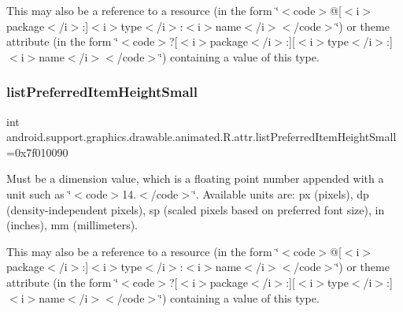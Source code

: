 This may also be a reference to a resource (in the form \char`\"{}$<$code$>$@\mbox{[}$<$i$>$package$<$/i$>$\+:\mbox{]}$<$i$>$type$<$/i$>$\+:$<$i$>$name$<$/i$>$$<$/code$>$\char`\"{}) or theme attribute (in the form \char`\"{}$<$code$>$?\mbox{[}$<$i$>$package$<$/i$>$\+:\mbox{]}\mbox{[}$<$i$>$type$<$/i$>$\+:\mbox{]}$<$i$>$name$<$/i$>$$<$/code$>$\char`\"{}) containing a value of this type. \mbox{\label{classandroid_1_1support_1_1graphics_1_1drawable_1_1animated_1_1R_1_1attr_a467936cc6be80ab5c2feae34d5062e49}} 
\subsubsection{\texorpdfstring{list\+Preferred\+Item\+Height\+Small}{listPreferredItemHeightSmall}}
{\footnotesize\ttfamily int android.\+support.\+graphics.\+drawable.\+animated.\+R.\+attr.\+list\+Preferred\+Item\+Height\+Small =0x7f010090\hspace{0.3cm}{\ttfamily [static]}}

Must be a dimension value, which is a floating point number appended with a unit such as \char`\"{}$<$code$>$14.\+5sp$<$/code$>$\char`\"{}. Available units are\+: px (pixels), dp (density-\/independent pixels), sp (scaled pixels based on preferred font size), in (inches), mm (millimeters). 

This may also be a reference to a resource (in the form \char`\"{}$<$code$>$@\mbox{[}$<$i$>$package$<$/i$>$\+:\mbox{]}$<$i$>$type$<$/i$>$\+:$<$i$>$name$<$/i$>$$<$/code$>$\char`\"{}) or theme attribute (in the form \char`\"{}$<$code$>$?\mbox{[}$<$i$>$package$<$/i$>$\+:\mbox{]}\mbox{[}$<$i$>$type$<$/i$>$\+:\mbox{]}$<$i$>$name$<$/i$>$$<$/code$>$\char`\"{}) containing a value of this type. \mbox{\label{classandroid_1_1support_1_1graphics_1_1drawable_1_1animated_1_1R_1_1attr_ac6359766bbb1bcbe65d08460099364fc}} 
